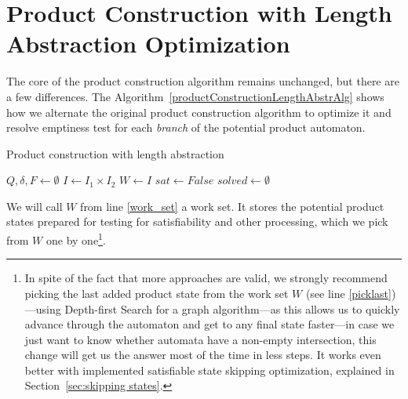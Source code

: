 \section{Product Construction with Length Abstraction Optimization}

The core of the product construction algorithm remains unchanged, but there are a few differences. The Algorithm~\ref{productConstructionLengthAbstrAlg} shows how we alternate the original product construction algorithm to optimize it and resolve emptiness test for each \emph{branch} of the potential product automaton.

\begin{algorithm}
\caption{Product construction with length abstraction}\label{productConstructionLengthAbstrAlg}
\DontPrintSemicolon
{}
\BlankLine
$Q, \delta, F \gets \emptyset$ \;
$I \gets I_1 \times I_2$ \;
$W \gets I$ \;\label{work_set}
$sat \gets False$ \;\label{sat}
$solved \gets \emptyset$ \;\label{solved}
\end{algorithm}

We will call $W$ from line \ref{work_set} a work set. It stores the potential product states prepared for testing for satisfiability and other processing, which we pick from $W$ one by one\footnote{In spite of the fact that more approaches are valid, we strongly recommend picking the last added product state from the work set $W$ (see line \ref{picklast})---using Depth-first Search for a graph algorithm---as this allows us to quickly advance through the automaton and get to any final state faster---in case we just want to know whether automata have a non-empty intersection, this change will get us the answer most of the time in less steps. It works even better with implemented satisfiable state skipping optimization, explained in Section~\ref{sec:skipping states}.}.

